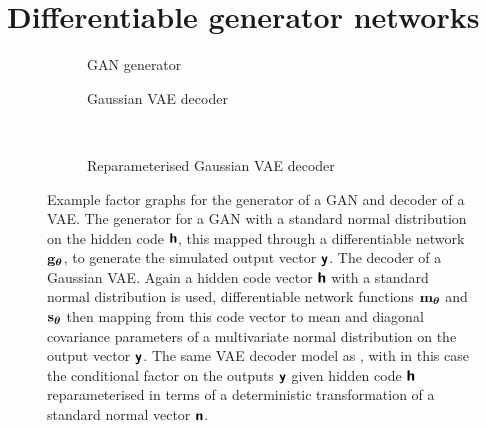 
\section{Differentiable generator networks}

\begin{figure}[!t]
\centering
\begin{subfigure}[t]{.35\linewidth}
\centering
{}
\caption{\acs{GAN} generator}\label{sfig:gan-generator}
\end{subfigure}%
\begin{subfigure}[t]{.55\linewidth}
\centering
{}
\caption{Gaussian \acs{VAE} decoder}\label{sfig:vae-decoder-marginalised}
\end{subfigure}%
\\[3mm]
\begin{subfigure}[t]{.8\linewidth}
\centering
{}
\caption{Reparameterised Gaussian \acs{VAE} decoder}\label{sfig:vae-decoder}
\end{subfigure}%
\caption[Differentiable generator network factor graphs.]{Example factor graphs for the generator of a \ac{GAN} and decoder of a \ac{VAE}.  The generator for a \ac{GAN} with a standard normal distribution on the hidden code $\boldsymbol{\mathsf{h}}$, this mapped through a differentiable network ${\mathbf{g}}_{\boldsymbol{\theta}}$, to generate the simulated output vector $\boldsymbol{\mathsf{y}}$.  The decoder of a Gaussian \ac{VAE}. Again a hidden code vector $\boldsymbol{\mathsf{h}}$ with a standard normal distribution is used, differentiable network functions ${\mathbf{m}}_{\boldsymbol{\theta}}$ and ${\mathbf{s}}_{\boldsymbol{\theta}}$ then mapping from this code vector to mean and diagonal covariance parameters of a multivariate normal distribution on the output vector $\boldsymbol{\mathsf{y}}$.  The same \ac{VAE} decoder model as , with in this case the conditional factor on the outputs $\boldsymbol{\mathsf{y}}$ given hidden code $\boldsymbol{\mathsf{h}}$ reparameterised in terms of a deterministic transformation of a standard normal vector $\boldsymbol{\mathsf{n}}$.}
\label{fig:gan-and-vae-factor-graphs}
\end{figure}

